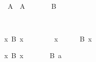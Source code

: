 \begin{isabellebody}
\begin{minipage}[t]{0.4\textwidth}
\isanewline
\ \ \isamarkupfalse%
\ {}{}\ A{}\ \ A%
\endisatagproof
{\isafoldproof}%
%
\isadelimproof
%
\endisadelimproof
%
\isadelimnoproof
\ %
\endisadelimnoproof
%
\isatagnoproof
{}\isamarkupfalse%
%
\endisatagnoproof
{\isafoldnoproof}%
%
\isadelimnoproof
\isanewline
%
\endisadelimnoproof
%
\isadelimproof
\ \ %
\endisadelimproof
%
\isatagproof
{}\isamarkupfalse%
\ \isamarkupfalse%
\ B\ \isamarkupfalse%
%
\end{minipage}\\[3ex]\begin{minipage}[t]{0.4\textwidth}
\isanewline
\ \ \isamarkupfalse%
\ {}{}x{}\ B\ x{}\isanewline
\ \ \isamarkupfalse%
\isanewline
\ \ \ \ \isamarkupfalse%
\ x\isanewline
\ \ \ \ \isamarkupfalse%
\ {}B\ x{}%
\endisatagproof
{\isafoldproof}%
%
\isadelimproof
%
\endisadelimproof
%
\isadelimnoproof
\ %
\endisadelimnoproof
%
\isatagnoproof
{}\isamarkupfalse%
%
\endisatagnoproof
{\isafoldnoproof}%
%
\isadelimnoproof
\isanewline
%
\endisadelimnoproof
%
\isadelimproof
\ \ %
\endisadelimproof
%
\isatagproof
{}\isamarkupfalse%
%
\end{minipage}\qquad\begin{minipage}[t]{0.4\textwidth}
\isanewline
\ \ \isamarkupfalse%
\ {}{}x{}\ B\ x{}%
\endisatagproof
{\isafoldproof}%
%
\isadelimproof
%
\endisadelimproof
%
\isadelimnoproof
\ %
\endisadelimnoproof
%
\isatagnoproof
{}\isamarkupfalse%
%
\endisatagnoproof
{\isafoldnoproof}%
%
\isadelimnoproof
\isanewline
%
\endisadelimnoproof
%
\isadelimproof
\ \ %
\endisadelimproof
%
\isatagproof
{}\isamarkupfalse%
\ \isamarkupfalse%
\ {}B\ a{}\ \isamarkupfalse%

\end{minipage}
\end{isabellebody}
